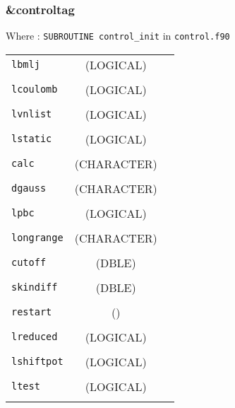 \documentclass[10pt,a4paper]{article}
\begin{document}
\subsubsection{\&controltag }

Where : \verb?SUBROUTINE control_init? in \verb?control.f90?
\newline

\begin{tabular}{lcc}
\\
\verb?lbmlj?     & (LOGICAL)          &   \\
\\
\verb?lcoulomb?  & (LOGICAL)          &   \\
\\
\verb?lvnlist?   & (LOGICAL)          &   \\
\\
\verb?lstatic?   & (LOGICAL)          &   \\
\\
\verb?calc?      & (CHARACTER)        &   \\
\\
\verb?dgauss?    & (CHARACTER)        &   \\
\\
\verb?lpbc?      & (LOGICAL)          &   \\
\\
\verb?longrange? & (CHARACTER)        &   \\
\\
\verb?cutoff?    & (DBLE) &   \\
\\
\verb?skindiff?  & (DBLE) &   \\
\\
\verb?restart?   & ()                 &   \\
\\
\verb?lreduced?  & (LOGICAL)          &   \\
\\
\verb?lshiftpot? & (LOGICAL)          &   \\
\\
\verb?ltest?     & (LOGICAL)          &   \\
\\
\end{tabular}

\end{document}
